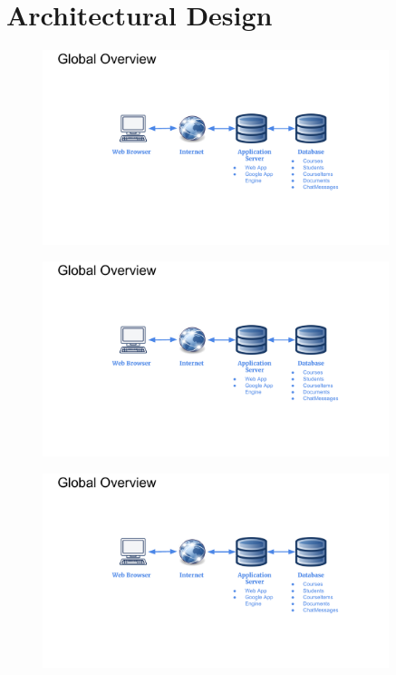 \documentclass[16pt]{scrreprt}
\begin{document}
\section{Architectural Design}

\begin{figure}[ht]
  \centering
  \includegraphics[page=1,width=0.9\textwidth]{diagrams/SDD_Diagrams.pdf}
  \label{fig:SDD_1}
\end{figure}

\begin{figure}[ht]
  \centering
  \includegraphics[page=2,width=0.9\textwidth]{diagrams/SDD_Diagrams.pdf}
  \label{fig:SDD_1}
\end{figure}

\begin{figure}[ht]
  \centering
  \includegraphics[page=3,width=0.9\textwidth]{diagrams/SDD_Diagrams.pdf}
  \label{fig:SDD_1}
\end{figure}
\end{document}
